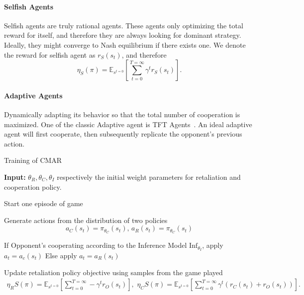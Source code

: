 \documentclass{article}
\begin{document}
\paragraph{Selfish Agents}
Selfish agents are truly rational agents.
These agents only optimizing the total reward for itself,
and therefore they are always looking for dominant strategy.
Ideally, they might converge to Nash equilibrium if there exists one.
We denote the reward for selfish agent as \(r_S(s_t)\), and therefore
\begin{equation}\label{equation:self_objective}
    \eta_S(\pi) =
    \mathbb{E}_{s^{t=0}}\left[\sum_{t=0}^{T=\infty}\gamma^t r_S(s_t)\right].
\end{equation}
\paragraph{Adaptive Agents}
Dynamically adapting its behavior so that the total number of cooperation is maximized.
One of the classic Adaptive agent is TFT Agents~\cite{nowak1993strategy}.
An ideal adaptive agent will first cooperate,
then subsequently replicate the opponent's previous action.
\begin{algorithm}[!t]
\caption{Training of CMAR}\label{algo}
\begin{algorithmic}[1]
\State \textbf{Input:}
    \(\theta_R, \theta_C, \theta_I\) respectively the initial weight parameters for retaliation and cooperation policy.

    \State Start one episode of game

        Generate actions from the distribution of two policies
        \begin{equation}
            a_C(s_t) = \pi_{\theta_C}(s_t), \, a_R(s_t) = \pi_{\theta_C}(s_t)
        \end{equation}

        \State If Opponent's cooperating according to the Inference Model \(\mbox{Inf}_{\theta_I}\), apply \(a_t = a_c(s_t)\)
        \State Else apply \(a_t = a_R(s_t)\)

    \EndWhile

    \State Update retaliation policy objective using samples from the game played
        \begin{equation}
            \begin{aligned}
                \eta_{R}S(\pi) = \mathbb{E}_{s^{t=0}}\left[\sum_{t=0}^{T=\infty}-\gamma^tr_O(s_t)\right],\,\,
                \eta_{C}S(\pi) = \mathbb{E}_{s^{t=0}}\left[\sum_{t=0}^{T=\infty}\gamma^t(r_C(s_t) + r_O(s_t))\right].
            \end{aligned}
        \end{equation}

\EndWhile\label{euclidendwhile}
\end{algorithmic}
\end{algorithm}
\end{document}
